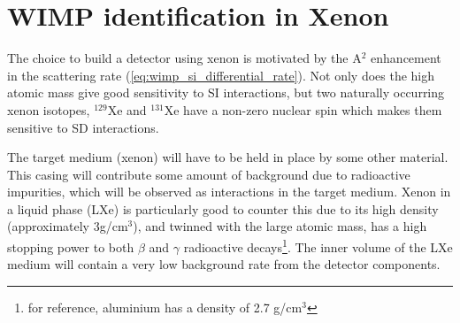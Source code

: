 \section{WIMP identification in Xenon}
\label{sec:wimps_with_xenon}

\par
The choice to build a detector using xenon is motivated by the A$^2$ enhancement in the scattering rate (\autoref{eq:wimp_si_differential_rate}).
Not only does the high atomic mass give good sensitivity to SI interactions, but two naturally occurring xenon isotopes, ${}^{129}$Xe and ${}^{131}$Xe have a non-zero nuclear spin which makes them sensitive to SD interactions.
\par
The target medium (xenon) will have to be held in place by some other material.
This casing will contribute some amount of background due to radioactive impurities, which will be observed as interactions in the target medium.
Xenon in a liquid phase (LXe) is particularly good to counter this due to its high density (approximately 3g/cm${}^{3}$), and twinned with the large atomic mass, has a high stopping power to both $\beta$ and $\gamma$ radioactive decays\footnote{for reference, aluminium has a density of 2.7 g/cm${}^{3}$}.
The inner volume of the LXe medium will contain a very low background rate from the detector components.



